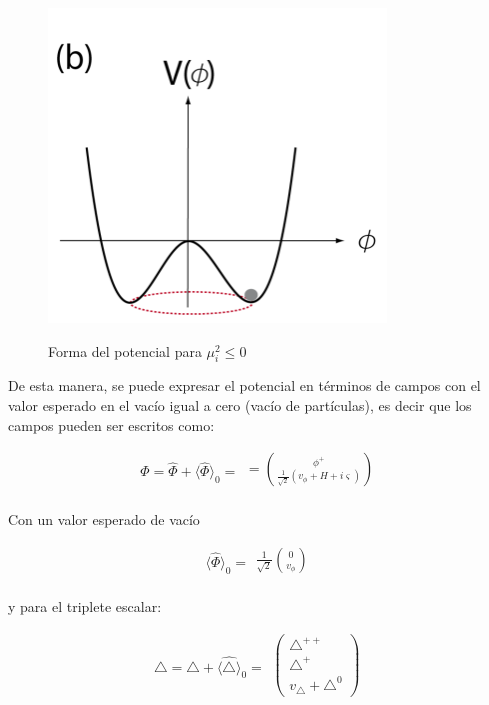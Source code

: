 \documentclass[12pt]{article}
\begin{document}
\begin{itemize}
\begin{figure}[h!]
    \begin{center}
        \includegraphics[scale=0.55]{Higgs Potential.png}
        \caption\tiny{Forma del potencial para $\mu_i^2\leq 0$}  
    \end{center}
\end{figure}
\end{itemize}

De esta manera, se puede expresar el potencial en términos de campos con el valor esperado en el vacío igual a cero (vacío de partículas), es decir que los campos pueden ser escritos como: 


\begin{equation}
    \Phi=\hat\Phi+ \langle \hat\Phi \rangle_0 = \begin{aligned}
   = \binom{\phi^{+}}{\frac{1}{\sqrt{2}}(v_\phi+ H + i\varsigma) } \\ 
\end{aligned}
\end{equation}

Con un valor esperado de vacío

\begin{equation}
    \langle \hat\Phi \rangle_0= \begin{aligned}
   \frac{1}{\sqrt{2}} \binom{0}{v_\phi } \\ 
\end{aligned}
\end{equation}

y para el triplete escalar: 



\begin{equation}
\triangle=\hat\triangle+ \langle \hat\triangle \rangle_0 =
\begin{aligned}
    \begin{pmatrix}  \triangle^{++} \\ \triangle^+ \\  v_\triangle+ \triangle^0 \end{pmatrix} \\
\end{aligned}
\end{equation} \\
\end{document}
